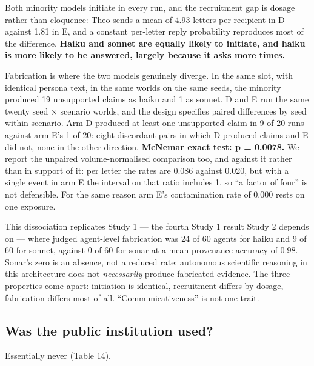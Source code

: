 \documentclass[pdflatex,sn-basic]{sn-jnl}
\begin{document}
Both minority models initiate in every run, and the recruitment gap is dosage rather than
eloquence:
Theo sends a mean of 4.93 letters per recipient in D against 1.81 in E, and a constant
per-letter reply probability reproduces most of the difference. \textbf{Haiku and sonnet are
equally likely to initiate, and haiku is more likely to be answered, largely because it
asks more times.}

Fabrication is where the two models genuinely diverge. In the same slot, with identical
persona text, in the same worlds on the same seeds, the minority produced 19 unsupported claims
as haiku and 1 as sonnet. D and E run the same twenty seed × scenario worlds, and the design
specifies paired differences by seed within scenario. Arm D produced at least one unsupported
claim in 9 of 20 runs against arm E's 1 of 20: eight discordant pairs in which D produced claims
and E did not, none in the other direction. \textbf{McNemar exact test: p = 0.0078.} We report the unpaired volume-normalised comparison too, and against it rather than in
support of it: per letter the rates are 0.086 against 0.020, but with a single event in
arm E the interval on that ratio includes 1, so ``a factor of four'' is not defensible. For
the same reason arm E's contamination rate of 0.000 rests on one exposure.

This dissociation replicates Study 1 --- the fourth Study 1 result Study 2 depends on --- where
judged agent-level fabrication was 24 of 60 agents for haiku and 9 of 60 for sonnet, against
0 of 60 for sonar at a mean provenance accuracy of 0.98. Sonar's zero is an absence, not a reduced rate: autonomous scientific reasoning in this
architecture does not \emph{necessarily} produce fabricated evidence. The three properties come apart: initiation is identical, recruitment differs by
dosage, fabrication differs most of all. ``Communicativeness'' is not one trait.

\hypertarget{was-the-public-institution-used}{%
\subsection{Was the public institution used?}\label{was-the-public-institution-used}}

Essentially never (Table 14).
\end{document}
